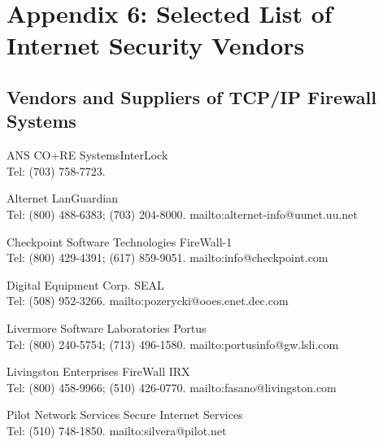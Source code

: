 \chapter{Appendix 6: Selected List of Internet Security Vendors}

\section{Vendors and Suppliers of TCP/IP Firewall Systems}

\begin{htmllist}

  \item[ANS CO+RE]
    SystemsInterLock\\
    Tel: (703) 758-7723.

  \item[Alternet]
    LanGuardian\\
    Tel: (800) 488-6383; (703) 204-8000.
    {mailto:alternet-info@uunet.uu.net}

  \item[Checkpoint Software Technologies]
      FireWall-1\\
      Tel: (800) 429-4391; (617) 859-9051.
      {mailto:info@checkpoint.com}

  \item[Digital Equipment Corp.]
    SEAL\\
    Tel: (508) 952-3266.
    {mailto:pozerycki@ooes.enet.dec.com}

  \item[Livermore Software Laboratories]
    Portus\\
    Tel: (800) 240-5754; (713) 496-1580.
    {mailto:portusinfo@gw.lsli.com}

  \item[Livingston Enterprises]
    FireWall IRX\\
    Tel: (800) 458-9966; (510) 426-0770.
    {mailto:fasano@livingston.com}

  \item[Pilot Network Services]
    Secure Internet Services\\
    Tel: (510) 748-1850.
    {mailto:silvera@pilot.net}


\end{htmllist}

